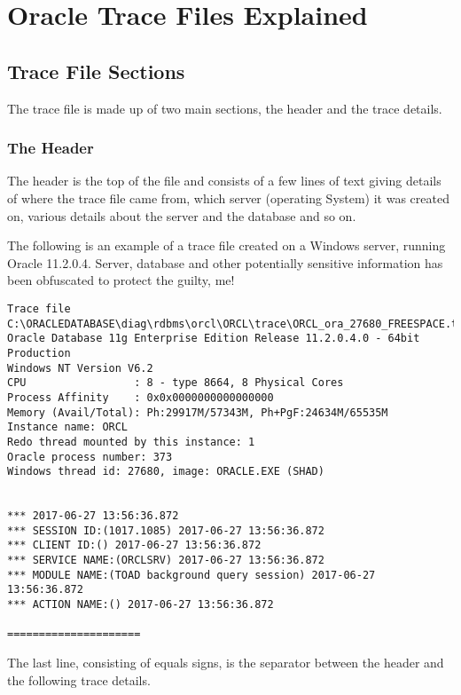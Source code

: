 \chapter{Oracle Trace Files Explained}\label{oracle-trace-files-explained}

\section{Trace File Sections}\label{trace-file-sections}

The trace file is made up of two main sections, the header and the trace details.

\subsection{The Header}\label{the-header}

The header is the top of the file and consists of a few lines of text giving details of where the trace file came from, which server (operating System) it was created on, various details about the server and the database and so on.

The following is an example of a trace file created on a Windows server, running Oracle 11.2.0.4. Server, database and other potentially sensitive information has been obfuscated to protect the guilty, me!

\begin{lstlisting}[numbers=none,caption={Oracle 11g Trace File Header}]
Trace file C:\ORACLEDATABASE\diag\rdbms\orcl\ORCL\trace\ORCL_ora_27680_FREESPACE.trc
Oracle Database 11g Enterprise Edition Release 11.2.0.4.0 - 64bit Production
Windows NT Version V6.2  
CPU                 : 8 - type 8664, 8 Physical Cores
Process Affinity    : 0x0x0000000000000000
Memory (Avail/Total): Ph:29917M/57343M, Ph+PgF:24634M/65535M 
Instance name: ORCL
Redo thread mounted by this instance: 1
Oracle process number: 373
Windows thread id: 27680, image: ORACLE.EXE (SHAD)


*** 2017-06-27 13:56:36.872
*** SESSION ID:(1017.1085) 2017-06-27 13:56:36.872
*** CLIENT ID:() 2017-06-27 13:56:36.872
*** SERVICE NAME:(ORCLSRV) 2017-06-27 13:56:36.872
*** MODULE NAME:(TOAD background query session) 2017-06-27 13:56:36.872
*** ACTION NAME:() 2017-06-27 13:56:36.872

=====================
\end{lstlisting}

The last line, consisting of equals signs, is the separator between the header and the following trace details.

